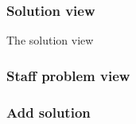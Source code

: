 \subsubsection{Solution view}
The solution view 

\subsubsection{Staff problem view}




\subsubsection{Add solution}



